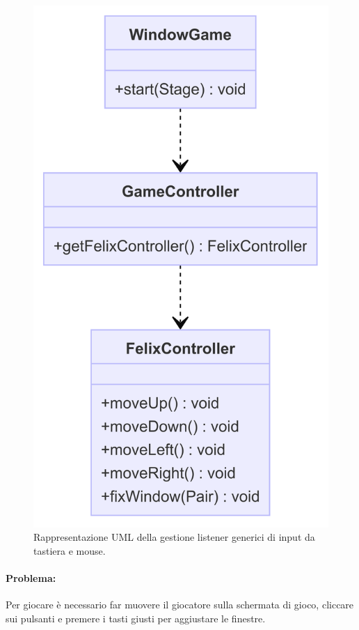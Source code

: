 \documentclass[a4paper,12pt]{report}
\begin{document}
\begin{figure}[H]
\centering{}
\includegraphics[width=\textwidth]{img/input.png}
\caption{Rappresentazione UML della gestione listener generici di input da tastiera e mouse.}
\end{figure}

\paragraph{Problema:}
Per giocare è necessario far muovere il giocatore sulla schermata di gioco, cliccare sui pulsanti e premere i tasti giusti per aggiustare le finestre.
\end{document}
